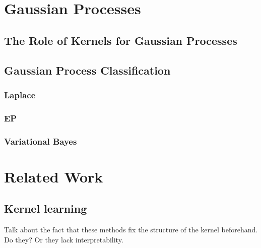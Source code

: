 \documentclass[a4paper,12pt ]{report}
\begin{document}

\chapter{Gaussian Processes}

\section{The Role of Kernels for Gaussian Processes}

\section{Gaussian Process Classification}

\subsection{Laplace}

\subsection{EP}

\subsection{Variational Bayes}

\clearpage

\chapter{Related Work} 

\section{Kernel learning}

Talk about the fact that these methods fix the structure of the kernel beforehand. Do they? Or they lack interpretability.

\end{document}
